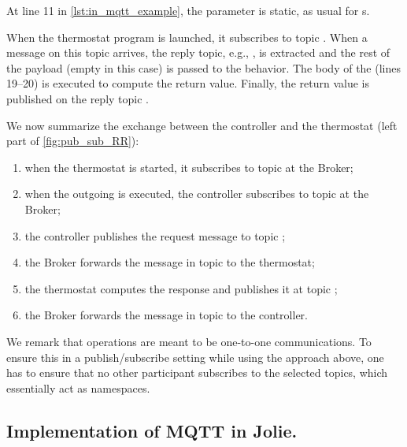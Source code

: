 At line 11 in \cref{lst:in_mqtt_example}, the  parameter
 is static, as usual for s.

When the thermostat program is launched, it subscribes to topic
. When a message on this topic arrives, the reply
topic, e.g., , is extracted and the rest of the payload
(empty in this case) is passed to the behavior. The body of the
 (lines 19--20) is executed to compute the return value.
Finally, the return value is published on the reply topic
.

We now summarize the exchange between the controller and the thermostat (left
part of \cref{fig:pub_sub_RR}):

\begin{enumerate}
  \item when the thermostat is started, it subscribes to topic  at the
  Broker;

  \item when the outgoing  is executed, the controller
  subscribes to topic  at the Broker;

  \item the controller publishes the request message to topic
  ;

  \item the Broker forwards the message in topic  to
  the thermostat;

  \item the thermostat computes the response and publishes it at topic 
  ;

  \item the Broker forwards the message in topic  to the
  controller.

\end{enumerate}

We remark that  operations are meant to be one-to-one
communications. To ensure this in a publish/subscribe setting while using the
approach above, one has to ensure that no other participant subscribes to the
selected topics, which essentially act as namespaces.

\subsection{Implementation of MQTT in Jolie.} %
\label{sub:impl_mqtt}

